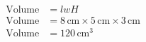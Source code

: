 \documentclass[12pt]{article}
\begin{document}
\hfill
\begin{minipage}{.5\textwidth}
  \begin{align*}
  \text{Volume} &= lwH \\
  \text{Volume} &= 8 \,\text{cm} \times 5 \,\text{cm} \times 3 \,\text{cm} \\
  \text{Volume} &= 120 \,\text{cm}^3
  \end{align*}
\end{minipage}
\par\vspace{1cm}
\end{document}
